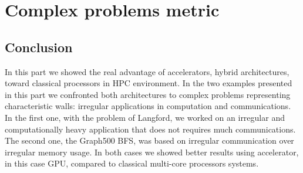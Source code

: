 \part{Complex problems metric}










\chapter*{Conclusion}
In this part we showed the real advantage of accelerators, hybrid architectures, toward classical processors in HPC environment. 
In the two examples presented in this part we confronted both architectures to complex problems representing characteristic walls: irregular applications in computation and communications. 
In the first one, with the problem of Langford, we worked on an irregular and computationally heavy application that does not requires much communications. 
The second one, the Graph500 BFS, was based on irregular communication over irregular memory usage. 
In both cases we showed better results using accelerator, in this case GPU, compared to classical multi-core processors systems. 

